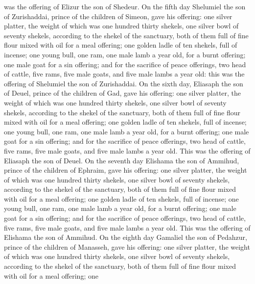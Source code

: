 was the offering of Elizur the son of Shedeur.  On the
fifth day Shelumiel the son of Zurishaddai, prince of the children of
Simeon,  gave his offering: one silver platter, the
weight of which was one hundred thirty shekels, one silver bowl of
seventy shekels, according to the shekel of the sanctuary, both of them
full of fine flour mixed with oil for a meal offering; 
one golden ladle of ten shekels, full of incense;  one
young bull, one ram, one male lamb a year old, for a burnt offering;
 one male goat for a sin offering;  and
for the sacrifice of peace offerings, two head of cattle, five rams,
five male goats, and five male lambs a year old: this was the offering
of Shelumiel the son of Zurishaddai.  On the sixth day,
Eliasaph the son of Deuel, prince of the children of Gad,
 gave his offering: one silver platter, the weight of
which was one hundred thirty shekels, one silver bowl of seventy
shekels, according to the shekel of the sanctuary, both of them full of
fine flour mixed with oil for a meal offering;  one
golden ladle of ten shekels, full of incense;  one young
bull, one ram, one male lamb a year old, for a burnt offering;
 one male goat for a sin offering;  and
for the sacrifice of peace offerings, two head of cattle, five rams,
five male goats, and five male lambs a year old. This was the offering
of Eliasaph the son of Deuel.  On the seventh day
Elishama the son of Ammihud, prince of the children of Ephraim,
 gave his offering: one silver platter, the weight of
which was one hundred thirty shekels, one silver bowl of seventy
shekels, according to the shekel of the sanctuary, both of them full of
fine flour mixed with oil for a meal offering;  one
golden ladle of ten shekels, full of incense;  one young
bull, one ram, one male lamb a year old, for a burnt offering;
 one male goat for a sin offering;  and
for the sacrifice of peace offerings, two head of cattle, five rams,
five male goats, and five male lambs a year old. This was the offering
of Elishama the son of Ammihud.  On the eighth day
Gamaliel the son of Pedahzur, prince of the children of Manasseh,
 gave his offering: one silver platter, the weight of
which was one hundred thirty shekels, one silver bowl of seventy
shekels, according to the shekel of the sanctuary, both of them full of
fine flour mixed with oil for a meal offering;  one

